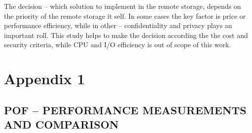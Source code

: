\documentclass[12pt]{article}
\begin{document}
The decision -- which solution to implement in the remote storage, depends on the priority  of the remote storage it self. In some cases the key factor is price or performance efficiency, while in other -- confidentiality and privacy plays an important roll. This study helps to make the decision according the the cost and security criteria, while CPU and I/O efficiency is out of scope of this work.

\pagebreak








\pagebreak


\appendix

\section{Appendix 1}

\label{Appendix 1}

\subsection*{POF -- PERFORMANCE MEASUREMENTS AND COMPARISON}
\end{document}
